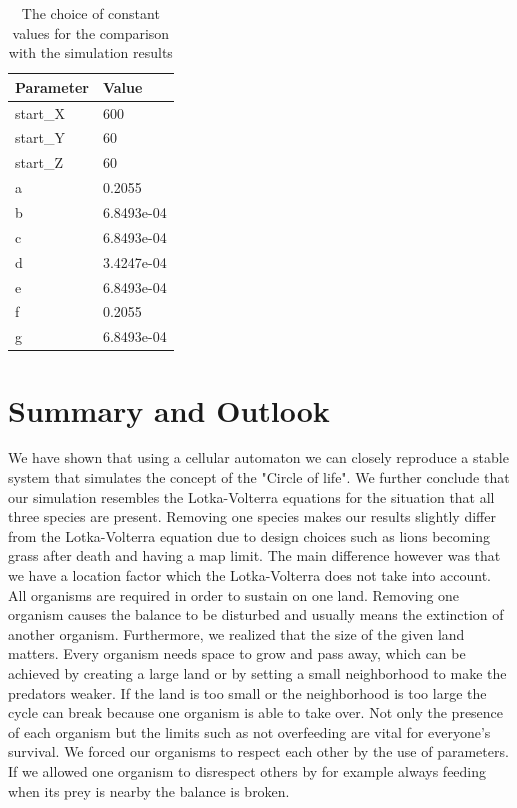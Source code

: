 \documentclass[11pt]{article}
\begin{document}
\begin{table}[htbp]
\centering
\begin{tabular}{l|l}
Parameter & Value \\ 
\hline 
\hline
start\_X & 600\\
\hline
start\_Y & 60\\
\hline
start\_Z & 60\\
\hline
a & 0.2055\\ 
\hline 
b & 6.8493e-04\\ 
\hline 
c & 6.8493e-04\\  
\hline 
d & 3.4247e-04\\
\hline 
e & 6.8493e-04\\
\hline 
f & 0.2055\\
\hline 
g & 6.8493e-04\\
\end{tabular}
\caption{The choice of constant values for the comparison with the simulation results}
\label{tab:LotkaVolterraParametersFinal}
\end{table}




\section{Summary and Outlook}
We have shown that using a cellular automaton we can closely reproduce a stable system that simulates the concept of the "Circle of life". We further conclude that our simulation resembles the Lotka-Volterra equations for the situation that all three species are present. Removing one species makes our results slightly differ from the Lotka-Volterra equation due to design choices such as lions becoming grass after death and having a map limit. The main difference however was that we have a location factor which the Lotka-Volterra does not take into account.
All organisms are required in order to sustain on one land. Removing one organism causes the balance to be disturbed and usually means the extinction of another organism.
Furthermore, we realized that the size of the given land matters. Every organism needs space to grow and pass away, which can be achieved by creating a large land or by setting a small neighborhood to make the predators weaker. If the land is too small or the neighborhood is too large the cycle can break because one organism is able to take over.  Not only the presence of each organism but the limits such as not overfeeding are vital for everyone's survival. We forced our organisms to respect each other by the use of parameters. If we allowed one organism to disrespect others by for example always feeding when its prey is nearby the balance is broken.
\appendix
\end{document}

